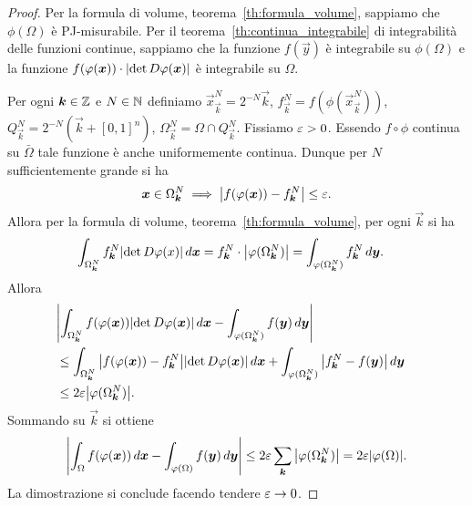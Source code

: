 \begin{proof}
Per la formula di volume, teorema~\ref{th:formula_volume},
sappiamo che $\phi(\Omega)$ è PJ-misurabile. 
Per il teorema~\ref{th:continua_integrabile} 
di integrabilità delle funzioni continue, sappiamo 
che la funzione $f(\vec y)$ è integrabile su $\phi(\Omega)$
e la funzione $f(\varphi(\boldsymbol x))\cdot {\left|\det D\varphi(\boldsymbol x)\right|}$
è integrabile su $\Omega$.

Per ogni $\boldsymbol k\in {\mathbb Z}$ e $N\in {\mathbb N}$ definiamo
$\vec x^N_{\vec k} = 2^{-N} \vec k$, 
$f^N_{\vec k} = f(\phi(\vec x^N_{\vec k}))$,
$Q^N_{\vec k} = 2^{-N}(\vec k+[0,1]^n)$,
$\Omega^N_{\vec k} = \Omega\cap Q^N_{\vec k}$.
Fissiamo $\varepsilon>0$.
Essendo $f\circ \phi$ continua su $\bar \Omega$ tale funzione 
è anche uniformemente continua. 
Dunque per $N$ sufficientemente grande si ha 
\[
\boldsymbol x\in \Omega^N_{\boldsymbol k} 
\implies
{\left|f(\varphi(\boldsymbol x))-f^N_{\boldsymbol k}\right|} \le \varepsilon.
\]
Allora per la formula di volume, teorema~\ref{th:formula_volume},
per ogni $\vec k$ si ha 
\begin{align*}
  \int_{\Omega^N_{\boldsymbol k}} f^N_{\boldsymbol k} {\left|\det D\varphi(x)\right|}\, d\boldsymbol x 
  &= f^N_{\boldsymbol k}\cdot {\left|\varphi(\Omega^N_{\boldsymbol k})\right|}
  = \int_{\varphi(\Omega^N_{\boldsymbol k})} f^N_{\boldsymbol k} \, d\boldsymbol y.
\end{align*}
Allora
\begin{align*}
  \lefteqn{\abs{\int_{\Omega^N_{\vec k}} f(\phi(\vec x))\abs{\det D\phi(\vec x)}\, d\vec x
  - \int_{\phi(\Omega^N_{\vec k})} f(\vec y)\, d\vec y}}\\
  &\le 
  \int_{\Omega^N_{\vec k}} \abs{f(\phi(\vec x))-f^N_{\vec k}} \abs{\det D\phi(\vec x)}\, d\vec x
  + \int_{\phi(\Omega^N_{\vec k})} \abs{f^N_{\vec k} - f(\vec y)}\, d\vec y \\
  & \le 2 \eps \abs{\phi(\Omega^N_{\vec k})}.
\end{align*}
Sommando su $\vec k$ si ottiene 
\[
  {\left|\int_\Omega f(\varphi(\boldsymbol x))\, d\boldsymbol x - \int_{\varphi(\Omega)}f(\boldsymbol y)\, d\boldsymbol y\right|}
  \le 2 \varepsilon \sum_{\boldsymbol k} {\left|\varphi(\Omega^N_{\boldsymbol k})\right|}
  = 2 \varepsilon {\left|\varphi(\Omega)\right|}.      
\]
La dimostrazione si conclude facendo tendere $\varepsilon\to 0$.
\end{proof}
